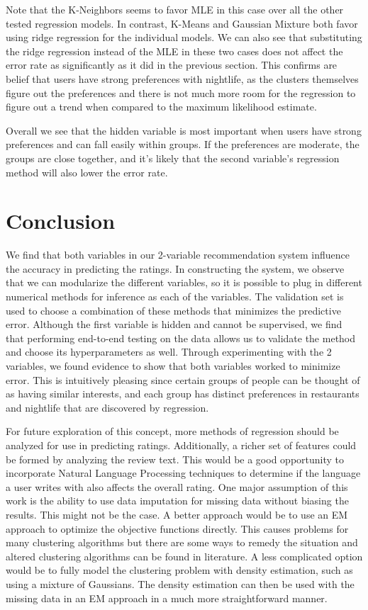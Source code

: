 \documentclass[11pt]{article}
\begin{document}
Note that the K-Neighbors seems to favor MLE in this case over all the other tested regression models. In contrast, K-Means and Gaussian Mixture both favor using ridge regression for the individual models. We can also see that substituting the ridge regression instead of the MLE in these two cases does not affect the error rate as significantly as it did in the previous section. This confirms are belief that users have strong preferences with nightlife, as the clusters themselves figure out the preferences and there is not much more room for the regression to figure out a trend when compared to the maximum likelihood estimate.

Overall we see that the hidden variable is most important when users have strong preferences and can fall easily within groups. If the preferences are moderate, the groups are close together, and it's likely that the second variable's regression method will also lower the error rate.

\section{Conclusion}
We find that both variables in our 2-variable recommendation system influence the accuracy in predicting the ratings. In constructing the system, we observe that we can modularize the different variables, so it is possible to plug in different numerical methods for inference as each of the variables. The validation set is used to choose a combination of these methods that minimizes the predictive error. Although the first variable is hidden and cannot be supervised, we find that performing end-to-end testing on the data allows us to validate the method and choose its hyperparameters as well. Through experimenting with the 2 variables, we found evidence to show that both variables worked to minimize error. This is intuitively pleasing since certain groups of people can be thought of as having similar interests, and each group has distinct preferences in restaurants and nightlife that are discovered by regression.

For future exploration of this concept, more methods of regression should be analyzed for use in predicting ratings. Additionally, a richer set of features could be formed by analyzing the review text. This would be a good opportunity to incorporate Natural Language Processing techniques to determine if the language a user writes with also affects the overall rating. One major assumption of this work is the ability to use data imputation for missing data without biasing the results. This might not be the case. A better approach would be to use an EM approach to optimize the objective functions directly. This causes problems for many clustering algorithms but there are some ways to remedy the situation and altered clustering algorithms can be found in literature. A less complicated option would be to fully model the clustering problem with density estimation, such as using a mixture of Gaussians. The density estimation can then be used with the missing data in an EM approach in a much more straightforward manner.
\end{document}
